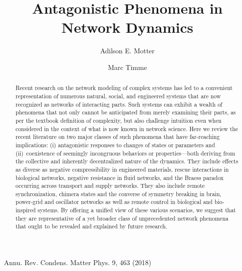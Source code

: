 \documentclass[
preprint,
superscriptaddress,
aps,
prl,
]{revtex4-1}
\begin{document}
\newcommand{\mytitle}{\Large Antagonistic Phenomena in Network Dynamics}
\title{\mytitle}


\author{Adilson E. Motter}
\author{Marc Timme}


\begin{abstract}
Recent research on the network modeling of complex systems has led to a convenient representation of numerous natural, social, and engineered systems that are now recognized as networks of interacting parts. Such systems can exhibit a wealth of phenomena that not only cannot be anticipated from merely examining their parts, as per the textbook definition of complexity, but also challenge intuition even when considered in the context of what is now known in network science.  Here we review the recent literature on two major classes of such phenomena that have far-reaching implications: (i) antagonistic responses to changes of states or parameters and 
(ii)~coexistence of seemingly incongruous  behaviors or properties---both deriving from the collective and inherently decentralized nature of the dynamics. They include effects as diverse as negative compressibility in engineered materials, rescue interactions in biological networks, negative resistance in fluid networks, and the Braess paradox occurring across transport and supply networks. They also include remote synchronization, chimera states and the converse of symmetry breaking in brain, 
power-grid and oscillator networks as well as remote control in biological and bio-inspired systems.  By offering a unified view of these various scenarios, we suggest that they are representative of a yet broader class of unprecedented network phenomena that ought to be revealed and explained by future research.
\end{abstract}

\hfill{\footnotesize  Annu. Rev. Condens. Matter Phys. 9, 463 (2018)}

\maketitle
\end{document}
